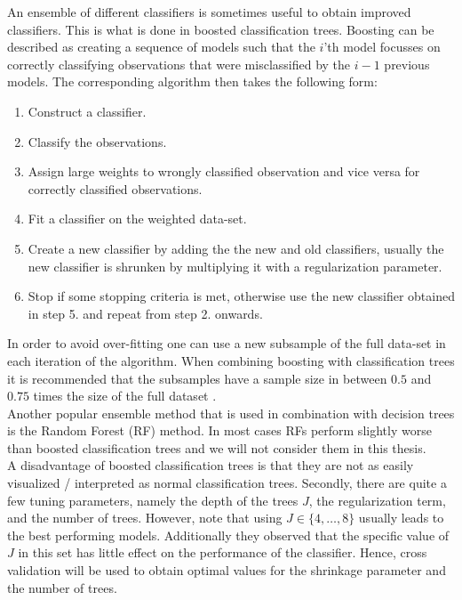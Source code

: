 An ensemble of different classifiers is sometimes useful to obtain improved classifiers. This is what is done in boosted classification trees. Boosting can be described as creating a sequence of models such that the $i$'th model focusses on correctly classifying observations that were misclassified by the $i-1$ previous models. The corresponding algorithm then takes the following form:\\
\begin{enumerate}
\item Construct a classifier.
\item Classify the observations.
\item Assign large weights to wrongly classified observation and vice versa for correctly classified observations. 
\item Fit a classifier on the weighted data-set.
\item Create a new classifier by adding the the new and old classifiers, usually the new classifier is shrunken by multiplying it with a regularization parameter.
\item Stop if some stopping criteria is met, otherwise use the new classifier obtained in step 5. and repeat from step 2. onwards.
\end{enumerate}

In order to avoid over-fitting one can use a new subsample of the full data-set in each iteration of the algorithm. When combining boosting with classification trees it is recommended that the subsamples have a sample size in between $0.5$ and $0.75$ times the size of the full dataset \parencite{elith_working_2008}.\\

Another popular ensemble method that is used in combination with decision trees is the Random Forest (RF) method. In most cases RFs perform slightly worse than boosted classification trees \parencite{hastie_elements_2009} and we will not consider them in this thesis.\\

A disadvantage of boosted classification trees is that they are not as easily visualized / interpreted as normal classification trees. Secondly, there are quite a few tuning parameters, namely the depth of the trees $J$, the regularization term, and the number of trees. However, \cite{hastie_elements_2009} note that using $J \in \{4,\dots,8\}$ usually leads to the best performing models. Additionally they observed that the specific value of $J$ in this set has little effect on the performance of the classifier. Hence, cross validation will be used to obtain optimal values for the shrinkage parameter and the number of trees.\\

